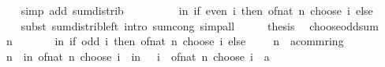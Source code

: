 \begin{isabellebody}
\ \ \ \ \isamarkupfalse%
\ {\isacharparenleft}{\kern0pt}simp\ add{\isacharcolon}{\kern0pt}\ sum{\isachardot}{\kern0pt}distrib{\isacharparenright}{\kern0pt}\isanewline
\ \ \isamarkupfalse%
\ \isamarkupfalse%
\ {\isachardoublequoteopen}{\isasymdots}\ {\isacharequal}{\kern0pt}\ {}\ {\isacharasterisk}{\kern0pt}\ {\isacharparenleft}{\kern0pt}{\isasymSum}i{\isasymle}n{\isachardot}{\kern0pt}\ if\ even\ i\ then\ of{\isacharunderscore}{\kern0pt}nat\ {\isacharparenleft}{\kern0pt}n\ choose\ i{\isacharparenright}{\kern0pt}\ else\ {}{\isacharparenright}{\kern0pt}{\isachardoublequoteclose}\isanewline
\ \ \ \ \isamarkupfalse%
\ {\isacharparenleft}{\kern0pt}subst\ sum{\isacharunderscore}{\kern0pt}distrib{\isacharunderscore}{\kern0pt}left{\isacharcomma}{\kern0pt}\ intro\ sum{\isachardot}{\kern0pt}cong{\isacharparenright}{\kern0pt}\ simp{\isacharunderscore}{\kern0pt}all\isanewline
\ \ \isamarkupfalse%
\ \isamarkupfalse%
\ {\isacharquery}{\kern0pt}thesis\ \isacommand{{\isachardot}{\kern0pt}{\isachardot}{\kern0pt}}\isamarkupfalse%
\isanewline
{}\isamarkupfalse%
%
\endisatagproof
{\isafoldproof}%
%
\isadelimproof
\isanewline
%
\endisadelimproof
\isanewline
{}\isamarkupfalse%
\ choose{\isacharunderscore}{\kern0pt}odd{\isacharunderscore}{\kern0pt}sum{\isacharcolon}{\kern0pt}\isanewline
\ \ \ {\isachardoublequoteopen}n\ {\isachargreater}{\kern0pt}\ {}{\isachardoublequoteclose}\isanewline
\ \ \ {\isachardoublequoteopen}{}\ {\isacharasterisk}{\kern0pt}\ {\isacharparenleft}{\kern0pt}{\isasymSum}i{\isasymle}n{\isachardot}{\kern0pt}\ if\ odd\ i\ then\ of{\isacharunderscore}{\kern0pt}nat\ {\isacharparenleft}{\kern0pt}n\ choose\ i{\isacharparenright}{\kern0pt}\ else\ {}{\isacharparenright}{\kern0pt}\ {\isacharequal}{\kern0pt}\ {\isacharparenleft}{\kern0pt}{}\ {\isacharcircum}{\kern0pt}\ n\ {\isacharcolon}{\kern0pt}{\isacharcolon}{\kern0pt}\ {\isacharprime}{\kern0pt}a{\isacharcolon}{\kern0pt}{\isacharcolon}{\kern0pt}comm{\isacharunderscore}{\kern0pt}ring{\isacharunderscore}{\kern0pt}{}{\isacharparenright}{\kern0pt}{\isachardoublequoteclose}\isanewline
%
\isadelimproof
%
\endisadelimproof
%
\isatagproof
{}\isamarkupfalse%
\ {\isacharminus}{\kern0pt}\isanewline
\ \ \isamarkupfalse%
\ {\isachardoublequoteopen}{}\ {\isacharcircum}{\kern0pt}\ n\ {\isacharequal}{\kern0pt}\ {\isacharparenleft}{\kern0pt}{\isasymSum}i{\isasymle}n{\isachardot}{\kern0pt}\ of{\isacharunderscore}{\kern0pt}nat\ {\isacharparenleft}{\kern0pt}n\ choose\ i{\isacharparenright}{\kern0pt}{\isacharparenright}{\kern0pt}\ {\isacharminus}{\kern0pt}\ {\isacharparenleft}{\kern0pt}{\isasymSum}i{\isasymle}n{\isachardot}{\kern0pt}\ {\isacharparenleft}{\kern0pt}{\isacharminus}{\kern0pt}{}{\isacharparenright}{\kern0pt}\ {\isacharcircum}{\kern0pt}\ i\ {\isacharasterisk}{\kern0pt}\ of{\isacharunderscore}{\kern0pt}nat\ {\isacharparenleft}{\kern0pt}n\ choose\ i{\isacharparenright}{\kern0pt}\ {\isacharcolon}{\kern0pt}{\isacharcolon}{\kern0pt}\ {\isacharprime}{\kern0pt}a{\isacharparenright}{\kern0pt}{\isachardoublequoteclose}\isanewline

\end{isabellebody}
